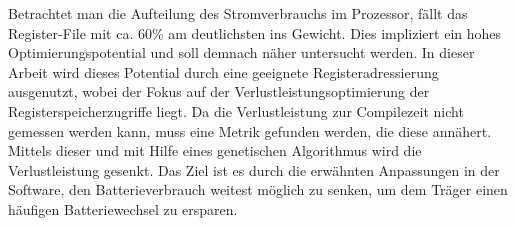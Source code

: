 Betrachtet man die Aufteilung des Stromverbrauchs im Prozessor, fällt das Register-File mit ca. 60\% am deutlichsten ins Gewicht. Dies impliziert ein hohes Optimierungspotential und soll demnach näher untersucht werden. In dieser Arbeit wird dieses Potential durch eine geeignete Registeradressierung ausgenutzt, wobei der Fokus auf der Verlustleistungsoptimierung der Registerspeicherzugriffe liegt. Da die Verlustleistung zur Compilezeit nicht gemessen werden kann, muss eine Metrik gefunden werden, die diese annähert. Mittels dieser und mit Hilfe eines genetischen Algorithmus wird die Verlustleistung gesenkt. Das Ziel ist es durch die erwähnten Anpassungen in der Software, den Batterieverbrauch weitest möglich zu senken, um dem Träger einen häufigen Batteriewechsel zu ersparen.






